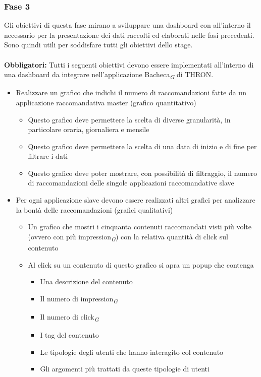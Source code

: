 \documentclass[a4paper, 12pt, twoside, openright]{book}
\newcommand{\gloss}[1]{#1\textsubscript{\textit{\tiny{G}}}}
\begin{document}
\subsubsection{Fase 3}
Gli obiettivi di questa fase mirano a sviluppare una dashboard con all'interno il necessario per la presentazione dei dati raccolti ed elaborati nelle fasi precedenti.\\ Sono quindi utili per soddisfare tutti gli obiettivi dello stage.\\ \\
\textbf{Obbligatori:}
Tutti i seguenti obiettivi devono essere implementati all'interno di una dashboard da integrare nell'applicazione \gloss{Bacheca} di THRON.
\begin{itemize}
	\item Realizzare un grafico che indichi il numero di raccomandazioni fatte da un applicazione raccomandativa master (grafico quantitativo)
	\begin{itemize}
		\item Questo grafico deve permettere la scelta di diverse granularità, in particolare oraria, giornaliera e mensile
		\item Questo grafico deve permettere la scelta di una data di inizio e di fine per filtrare i dati
		\item Questo grafico deve poter mostrare, con possibilità di filtraggio, il numero di raccomandazioni delle singole applicazioni raccomandative slave
	\end{itemize}
	
	\item Per ogni applicazione slave devono essere realizzati altri grafici per analizzare la bontà delle raccomandazioni (grafici qualitativi)
	\begin{itemize}
		\item Un grafico che mostri i cinquanta contenuti raccomandati visti più volte (ovvero con più \gloss{impression}) con la relativa quantità di click sul contenuto 
		\item Al click su un contenuto di questo grafico si apra un popup che contenga 
		\begin{itemize}
			\item Una descrizione del contenuto
			\item Il numero di \gloss{impression}
			\item Il numero di \gloss{click}
			\item I tag del contenuto
			\item Le tipologie degli utenti che hanno interagito col contenuto
			\item Gli argomenti più trattati da queste tipologie di utenti
		\end{itemize} 
		

\end{itemize}
\end{itemize}
\end{document}
